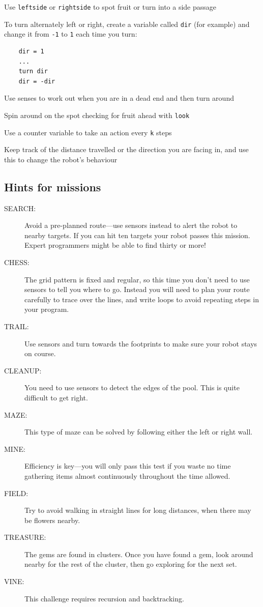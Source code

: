 \documentclass[12pt,a4paper,twoside]{article}
\renewcommand{\_}{\texttt{\symbol{95}}}
\newcommand{\mission}[1]{\item[#1:]}
\begin{document}
\begin{bulletlist}
\item Use \verb^leftside^ or \verb^rightside^ to spot fruit or turn
	into a side passage
\item To turn alternately left or right, create a variable called \verb^dir^
	(for example) and change it from \verb^-1^ to \verb^1^ each time you turn:
	\begin{verbatim}
	dir = 1
	...
	turn dir
	dir = -dir
	\end{verbatim}
\item Use senses to work out when you are in a dead end and then turn around
\item Spin around on the spot checking for fruit ahead with \verb^look^
\item Use a counter variable to take an action every \verb^k^ steps
\item Keep track of the distance travelled or the direction you are
	facing in, and use this to change the robot's behaviour
\end{bulletlist}

\subsection{Hints for missions}

\begin{description}
\mission{SEARCH}
	Avoid a pre-planned route---use sensors instead to alert the robot to
	nearby targets. If you can hit ten targets your robot passes
	this mission. Expert programmers might be able to find thirty or more!

\mission{CHESS}
	The grid pattern is fixed and regular, so this time you don't need to
	use sensors to tell you where to go.
	Instead you will need to plan your route carefully to trace over the
	lines, and write loops to avoid repeating steps in your program.

\mission{TRAIL}
	Use sensors and turn towards the footprints to make sure
	your robot stays on course.

\mission{CLEANUP}
	You need to use sensors to detect the edges of the pool.
	This is quite difficult to get right.

\mission{MAZE}
	This type of maze can be solved by
	following either the left or right wall.


\mission{MINE}
	Efficiency is key---you will only pass this test if you
	waste no time gathering items almost continuously throughout the
	time allowed.


\mission{FIELD}
	Try to avoid walking in straight lines for long distances, when
	there may be flowers nearby.

\mission{TREASURE}
	The gems are found in clusters. Once you have found a
	gem, look around nearby for the rest of the cluster, then
	go exploring for the next set.

\mission{VINE}
	This challenge requires recursion and backtracking.

\end{description}
\end{document}
